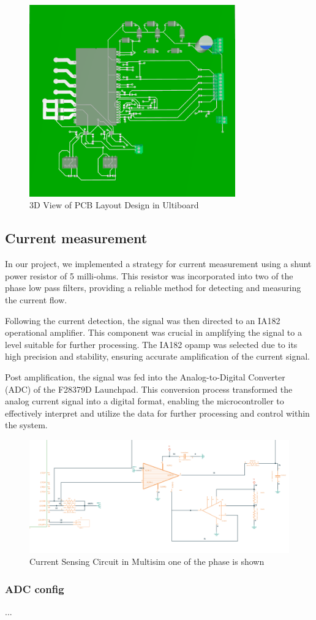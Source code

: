 \begin{figure}[H]
	\centering
	\includegraphics[width=3.5in]{sections/section4/images/PCBDesign/Ultiboard/3DTopView.png}
	\caption{3D View of PCB Layout Design in Ultiboard}
\end{figure}


\subsection{Current measurement}

In our project, we implemented a strategy for current measurement using a shunt power resistor of 5 milli-ohms. This resistor was incorporated into two of the phase low pass filters, providing a reliable method for detecting and measuring the current flow.

Following the current detection, the signal was then directed to an IA182 operational amplifier. This component was crucial in amplifying the signal to a level suitable for further processing. The IA182 opamp was selected due to its high precision and stability, ensuring accurate amplification of the current signal.

Post amplification, the signal was fed into the Analog-to-Digital Converter (ADC) of the F28379D Launchpad. This conversion process transformed the analog current signal into a digital format, enabling the microcontroller to effectively interpret and utilize the data for further processing and control within the system. 



\begin{figure}[H]
	\centering
	\includegraphics[width=6in]{sections/section4/images/PCBDesign/Multisim/MultisimCurrentSensing.png}
	\caption{Current Sensing Circuit in Multisim one of the phase is shown}
\end{figure}


\subsubsection{ADC config}

...

\newpage